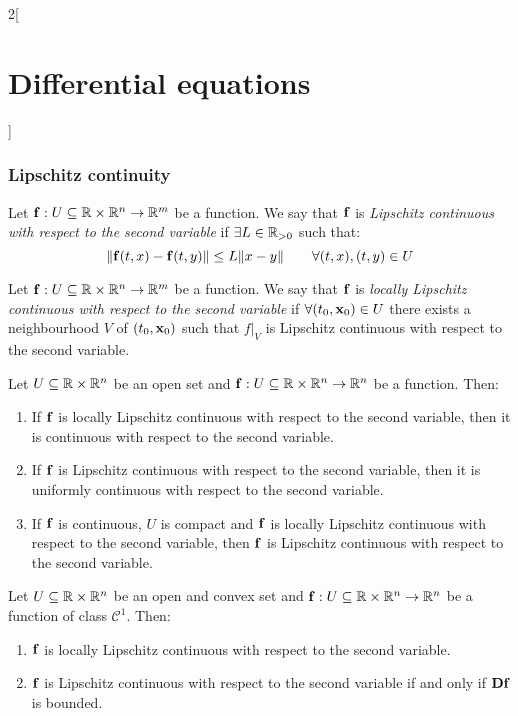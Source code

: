 \documentclass[../../../main.tex]{subfiles}
\begin{document}
\begin{multicols}{2}[\section{Differential equations}]
    \subsubsection{Lipschitz continuity}
    \begin{definition}
        Let $\boldsymbol{\mathrm{f}}:U\subseteq\mathbb{R}\times\mathbb{R}^n\rightarrow\mathbb{R}^m$ be a function. We say that $\boldsymbol{\mathrm{f}}$ is \textit{Lipschitz continuous with respect to the second variable} if $\exists L\in\mathbb{R}_{>0}$ such that: $$\|\boldsymbol{\mathrm{f}}(t,x)-\boldsymbol{\mathrm{f}}(t,y)\|\leq L\|x-y\|\qquad\forall (t,x),(t,y)\in U$$
    \end{definition}
    \begin{definition}
        Let $\boldsymbol{\mathrm{f}}:U\subseteq\mathbb{R}\times\mathbb{R}^n\rightarrow\mathbb{R}^m$ be a function. We say that $\boldsymbol{\mathrm{f}}$ is \textit{locally Lipschitz continuous with respect to the second variable} if $\forall (t_0,\boldsymbol{\mathrm{x}}_0)\in U$ there exists a neighbourhood $V$ of $(t_0,\boldsymbol{\mathrm{x}}_0)$ such that $f|_V$ is Lipschitz continuous with respect to the second variable.
    \end{definition}
    \begin{prop}
        Let $U\subseteq\mathbb{R}\times\mathbb{R}^n$ be an open set and $\boldsymbol{\mathrm{f}}:U\subseteq\mathbb{R}\times\mathbb{R}^n\rightarrow\mathbb{R}^n$ be a function. Then:
        \begin{enumerate}
            \item If $\boldsymbol{\mathrm{f}}$ is locally Lipschitz continuous with respect to the second variable, then it is continuous with respect to the second variable.
            \item If $\boldsymbol{\mathrm{f}}$ is Lipschitz continuous with respect to the second variable, then it is uniformly continuous with respect to the second variable.
            \item If $\boldsymbol{\mathrm{f}}$ is continuous, $U$ is compact and $\boldsymbol{\mathrm{f}}$ is locally Lipschitz continuous with respect to the second variable, then $\boldsymbol{\mathrm{f}}$ is Lipschitz continuous with respect to the second variable.
        \end{enumerate}
    \end{prop}
    \begin{prop}
        Let $U\subseteq\mathbb{R}\times\mathbb{R}^n$ be an open and convex set and $\boldsymbol{\mathrm{f}}:U\subseteq\mathbb{R}\times\mathbb{R}^n\rightarrow\mathbb{R}^n$ be a function of class $\mathcal{C}^1$. Then:
        \begin{enumerate}
            \item $\boldsymbol{\mathrm{f}}$ is locally Lipschitz continuous with respect to the second variable.
            \item $\boldsymbol{\mathrm{f}}$ is Lipschitz continuous with respect to the second variable if and only if $\boldsymbol{\mathrm{Df}}$ is bounded.
        \end{enumerate}
    \end{prop}

\end{multicols}
\end{document}
